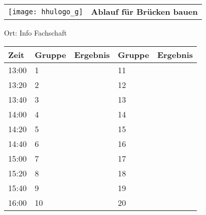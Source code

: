 \documentclass[a4paper,10pt]{article}
\def\spiela{Brücken bauen}
\def\rauma{Info Fachschaft}
\begin{document}
  \begin{tabularx}{\textwidth}{lc}
    \texttt{[image: hhulogo\_g]}
  & {\Huge \textbf{Ablauf für \spiela}}
  \end{tabularx}
  \LARGE
  \begin{center}
    \vspace{1cm} 
    Ort: \rauma
  \end{center}
    \vspace{2cm} 
    \begin{tabularx}{\textwidth}{X||X|X||X|X}
	\textbf{Zeit} &\textbf{Gruppe} & \textbf{Ergebnis} &\textbf{Gruppe} & \textbf{Ergebnis}  	\\ \hline \hline
	13:00 &	1	&	&11	&	\\ \hline
	13:20 &	2	&	&12	&	\\ \hline
	13:40 &	3	&	&13	&	\\ \hline

	14:00 &	4	&	&14	&	\\ \hline
	14:20 &	5	&	&15	&	\\ \hline
	14:40 &	6	&	&16	&	\\ \hline

	15:00 &	7	&	&17	&	\\ \hline
	15:20 &	8	&	&18	&	\\ \hline
	15:40 &	9	&	&19	&	\\ \hline

	16:00 &	10	&	&20	&	\\ \hline
      
    \end{tabularx}
   
   \newpage
\end{document}
